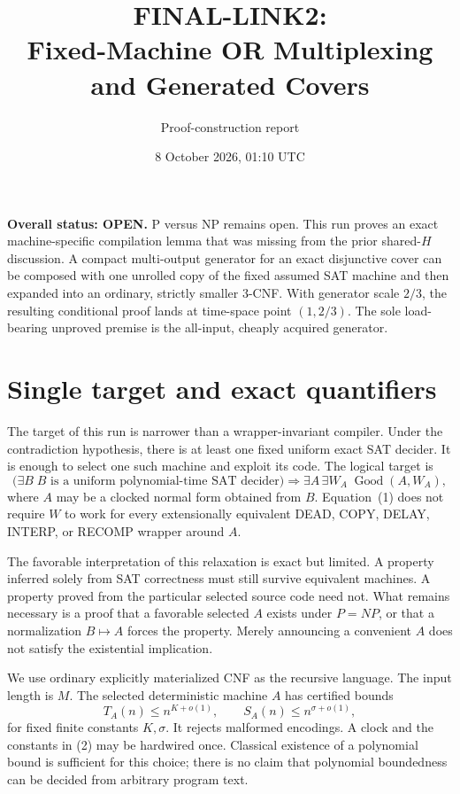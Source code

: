 \documentclass[11pt]{article}
\title{\bfseries FINAL-LINK2:\\[0.2em]
Fixed-Machine OR Multiplexing and Generated Covers}
\author{Proof-construction report}
\date{8 October 2026, 01:10 UTC}
\newcommand{\Good}{\operatorname{Good}}
\newcommand{\OPEN}{\textcolor{openstatus}{\textbf{OPEN}}}
\begin{document}
\maketitle

\begin{openstatusbox}
\textbf{Overall status: \OPEN.}
P versus NP remains open.  This run proves an exact machine-specific
compilation lemma that was missing from the prior shared-$H$ discussion.  A
compact multi-output generator for an exact disjunctive cover can be composed
with one unrolled copy of the fixed assumed SAT machine and then expanded into
an ordinary, strictly smaller 3-CNF.  With generator scale $2/3$, the resulting
conditional proof lands at time-space point $(1,2/3)$.  The sole load-bearing
unproved premise is the all-input, cheaply acquired generator.
\end{openstatusbox}

\section{Single target and exact quantifiers}

The target of this run is narrower than a wrapper-invariant compiler.  Under
the contradiction hypothesis, there is at least one fixed uniform exact SAT
decider.  It is enough to select one such machine and exploit its code.  The
logical target is
\begin{equation}
 \bigl(\exists B\; B\text{ is a uniform polynomial-time SAT decider}\bigr)
 \Longrightarrow
 \exists A\,\exists W_A\; \Good(A,W_A),                 \tag{1}
\end{equation}
where $A$ may be a clocked normal form obtained from $B$.  Equation~(1) does
not require $W$ to work for every extensionally equivalent DEAD, COPY, DELAY,
INTERP, or RECOMP wrapper around $A$.

The favorable interpretation of this relaxation is exact but limited.  A
property inferred solely from SAT correctness must still survive equivalent
machines.  A property proved from the particular selected source code need
not.  What remains necessary is a proof that a favorable selected $A$ exists
under $P=NP$, or that a normalization $B\mapsto A$ forces the property.  Merely
announcing a convenient $A$ does not satisfy the existential implication.

We use ordinary explicitly materialized CNF as the recursive language.  The
input length is $M$.  The selected deterministic machine $A$ has certified
bounds
\begin{equation}
 T_A(n)\le n^{K+o(1)},\qquad S_A(n)\le n^{\sigma+o(1)},  \tag{2}
\end{equation}
for fixed finite constants $K,\sigma$.  It rejects malformed encodings.  A
clock and the constants in (2) may be hardwired once.  Classical existence of
a polynomial bound is sufficient for this choice; there is no claim that
polynomial boundedness can be decided from arbitrary program text.
\end{document}
